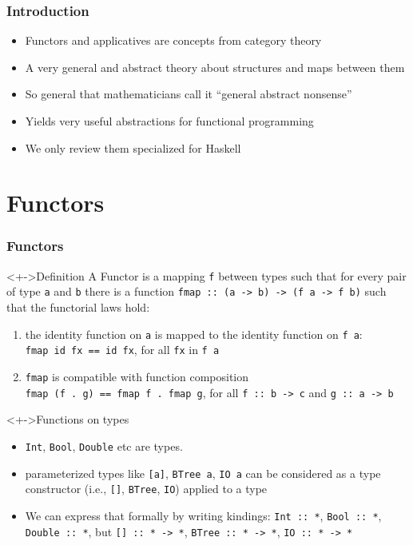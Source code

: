 \documentclass{beamer}
\subtitle
{Functors, Applicatives, and Parsers}
\begin{document}
\begin{frame}
  \titlepage
\end{frame}

\begin{frame}
  \frametitle{Introduction}
  \begin{itemize}
  \item Functors and applicatives are concepts from \alert{category
      theory}
  \item A very general and abstract theory about structures and maps between them
  \item So general that mathematicians call it ``general abstract
    nonsense''
  \item Yields very useful abstractions for functional programming
  \item We only review them specialized for Haskell
  \end{itemize}
\end{frame}

\section{Functors}
\begin{frame}[fragile]
  \frametitle{Functors}
  \begin{block}<+->{Definition}
    A \alert{Functor} is a mapping \lstinline{f} between types such that for
    every pair of type \lstinline{a} and \lstinline$b$ there is a
    function 
    \lstinline|fmap :: (a -> b) -> (f a -> f b)|
    such that the \alert{functorial laws} hold:
    \begin{enumerate}
    \item the identity function on \lstinline$a$ is mapped to the
      identity function on \lstinline$f a$:\\
      \lstinline$fmap id fx == id fx$, \quad for all \lstinline$fx$ in
      \lstinline$f a$
    \item \lstinline$fmap$ is compatible with function composition\\
      \lstinline$fmap (f . g) == fmap f . fmap g$, \quad for all
      \lstinline$f :: b -> c$ and \lstinline$g :: a -> b$
    \end{enumerate}
  \end{block}
  \begin{alertblock}<+->{Functions on types}
    \begin{itemize}
    \item \lstinline{Int}, \lstinline{Bool}, \lstinline{Double} etc
      are types.
    \item parameterized types like \lstinline$[a]$,
      \lstinline$BTree a$, \lstinline$IO a$ can be considered as a
      type constructor (i.e., \lstinline$[]$, \lstinline$BTree$,
      \lstinline$IO$) applied to a type 
    \item We can express that formally by writing \alert{kindings}:
      \lstinline{Int :: *},
      \lstinline{Bool :: *},
      \lstinline{Double :: *}, but
      \lstinline{[] :: * -> *},
      \lstinline{BTree :: * -> *},
      \lstinline{IO :: * -> *}
    \end{itemize}
  \end{alertblock}
\end{frame}
\end{document}
